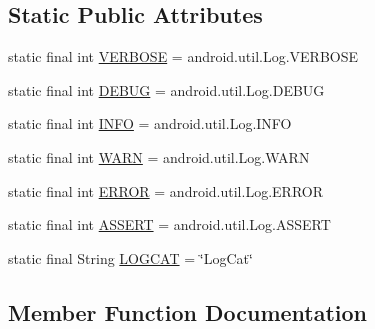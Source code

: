 \subsection*{Static Public Attributes}
\begin{DoxyCompactItemize}
\item 
static final int \hyperlink{classcom_1_1toast_1_1android_1_1gamebase_1_1base_1_1log_1_1_logger_ae1ccf795aa20dbf8aa62619c2efa44ec}{V\+E\+R\+B\+O\+SE} = android.\+util.\+Log.\+V\+E\+R\+B\+O\+SE
\item 
static final int \hyperlink{classcom_1_1toast_1_1android_1_1gamebase_1_1base_1_1log_1_1_logger_a721812cc43754ab72ef194ed99a931d0}{D\+E\+B\+UG} = android.\+util.\+Log.\+D\+E\+B\+UG
\item 
static final int \hyperlink{classcom_1_1toast_1_1android_1_1gamebase_1_1base_1_1log_1_1_logger_ab837e03a1190d42a17684f8dbb5d8572}{I\+N\+FO} = android.\+util.\+Log.\+I\+N\+FO
\item 
static final int \hyperlink{classcom_1_1toast_1_1android_1_1gamebase_1_1base_1_1log_1_1_logger_a585a3ce80dc75330d091795f561473b5}{W\+A\+RN} = android.\+util.\+Log.\+W\+A\+RN
\item 
static final int \hyperlink{classcom_1_1toast_1_1android_1_1gamebase_1_1base_1_1log_1_1_logger_aa8f7adc893367cd8c4b10222a528a616}{E\+R\+R\+OR} = android.\+util.\+Log.\+E\+R\+R\+OR
\item 
static final int \hyperlink{classcom_1_1toast_1_1android_1_1gamebase_1_1base_1_1log_1_1_logger_a3d462acb7f869e29b976cfd5015c2a82}{A\+S\+S\+E\+RT} = android.\+util.\+Log.\+A\+S\+S\+E\+RT
\item 
static final String \hyperlink{classcom_1_1toast_1_1android_1_1gamebase_1_1base_1_1log_1_1_logger_aa7a0be1813d71b79c680be953023d6a6}{L\+O\+G\+C\+AT} = \char`\"{}Log\+Cat\char`\"{}
\end{DoxyCompactItemize}


\subsection{Member Function Documentation}
\mbox{\label{classcom_1_1toast_1_1android_1_1gamebase_1_1base_1_1log_1_1_logger_a82d31f975cf96db679b6ee67481daf3b}} 
